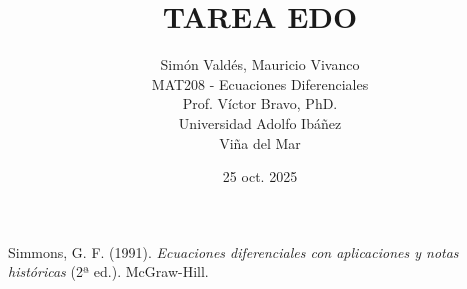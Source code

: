 \documentclass[a4paper,12pt]{book}
\begin{document}
	\title{TAREA EDO}
	\author{Simón Valdés, Mauricio Vivanco\\MAT208 - Ecuaciones Diferenciales\\Prof. Víctor Bravo, PhD.\\Universidad Adolfo Ibáñez\\Viña del Mar}
	\date{25 oct. 2025}

	\maketitle
	\newpage
	\tableofcontents
	

	\newpage
	



	
	
	
	
	
	
	
	
	
	
	
	
	
\newpage

\begin{thebibliography}{9}
	Simmons, G. F. (1991).
	\emph{Ecuaciones diferenciales con aplicaciones y notas históricas} (2ª ed.).
	McGraw-Hill.
\end{thebibliography}

		
\end{document}
